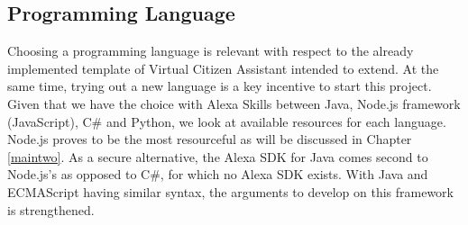 	
	
	
	\subsection*{Programming Language}
	Choosing a programming language is relevant %
	with respect to the already implemented template of %
	Virtual Citizen Assistant %
	intended to extend. At the same time, trying out a new language is a key incentive to start this project. Given that we have the %
	choice with Alexa Skills between Java, Node.js framework (JavaScript), C\# and Python, we look at available resources for each language. Node.js proves to be the most resourceful as will be discussed in Chapter \ref{maintwo}. As a secure alternative, the Alexa SDK for Java comes second to Node.js's as opposed to C\#, for which no Alexa SDK exists. With Java and ECMAScript having similar syntax, the arguments to develop on this framework is strengthened.
	



%
%




%



